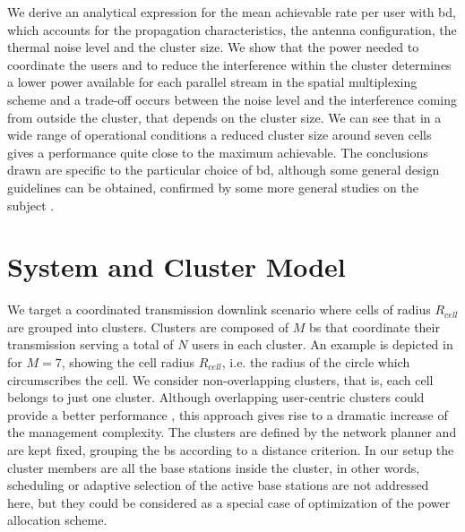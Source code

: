 We derive an analytical expression for the mean achievable rate per user with \gls{bd}, which accounts for the propagation characteristics, the antenna configuration, the thermal noise level and the cluster size. We show that the power needed to coordinate the users and to reduce the interference within the cluster determines a lower power available for each parallel stream in the spatial multiplexing scheme and a trade-off occurs between the noise level and the interference coming from outside the cluster, that depends on the cluster size. We can see that in a wide range of operational conditions a reduced cluster size around seven cells gives a performance quite close to the maximum achievable. The conclusions drawn are specific to the particular choice of \gls{bd}, although some general design guidelines can be obtained, confirmed by some more general studies on the subject \cite{lozano13}.


\section{System and Cluster Model}\label{sec:system_model}

We target a coordinated transmission downlink scenario where cells of radius $R_{cell}$ are grouped into clusters. Clusters are
composed of $M$ \gls{bs} that coordinate their transmission serving a total of $N$ users in each cluster. 
An example is depicted in  for $M=7$, showing the cell radius $R_{cell}$, i.e. the radius of the circle which circumscribes the cell.
We consider non-overlapping clusters, that is, each cell belongs to just one cluster. Although overlapping user-centric clusters could provide a better performance \cite{bjornson11}, this approach gives rise to a dramatic increase of the management complexity. 
The clusters are defined by the network planner and are kept fixed, grouping the \gls{bs} according to a distance criterion.
In our setup the cluster members are all the base stations inside the cluster, in other words, scheduling or adaptive selection of the active base stations are not addressed here, but they could be considered as a special case of optimization of the power allocation scheme.

